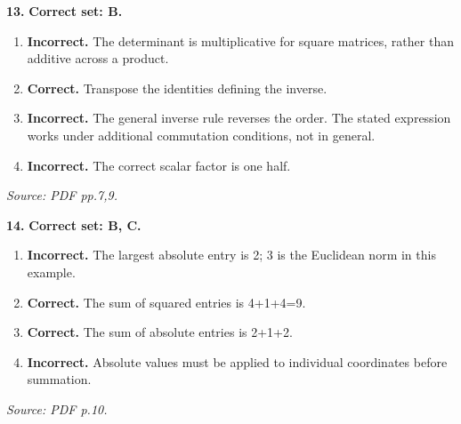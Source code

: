 \documentclass[11pt,a4paper]{article}
\begin{document}
\par\noindent\begin{minipage}{\linewidth}
\textbf{13.} \textbf{Correct set: B.}
\begin{enumerate}[label=(\Alph*),leftmargin=8mm,itemsep=2pt,topsep=2pt]
\item \textbf{Incorrect.} The determinant is multiplicative for square matrices, rather than additive across a product.
\item \textbf{Correct.} Transpose the identities defining the inverse.
\item \textbf{Incorrect.} The general inverse rule reverses the order. The stated expression works under additional commutation conditions, not in general.
\item \textbf{Incorrect.} The correct scalar factor is one half.
\end{enumerate}
{\footnotesize\textit{Source: PDF pp.7,9.}}

\end{minipage}\par\vspace{3mm}
\par\noindent\begin{minipage}{\linewidth}
\textbf{14.} \textbf{Correct set: B, C.}
\begin{enumerate}[label=(\Alph*),leftmargin=8mm,itemsep=2pt,topsep=2pt]
\item \textbf{Incorrect.} The largest absolute entry is 2; 3 is the Euclidean norm in this example.
\item \textbf{Correct.} The sum of squared entries is 4+1+4=9.
\item \textbf{Correct.} The sum of absolute entries is 2+1+2.
\item \textbf{Incorrect.} Absolute values must be applied to individual coordinates before summation.
\end{enumerate}
{\footnotesize\textit{Source: PDF p.10.}}

\end{minipage}\par\vspace{3mm}
\end{document}
